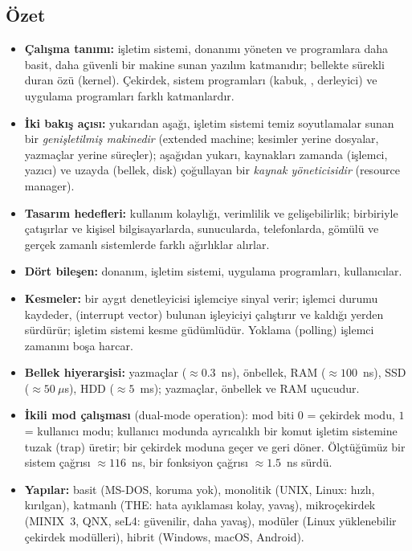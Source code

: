 \subsection*{Özet}
\begin{itemize}
  \item \textbf{Çalışma tanımı:} işletim sistemi, donanımı yöneten ve programlara daha basit, daha güvenli bir makine sunan yazılım katmanıdır; bellekte sürekli duran özü  (kernel). Çekirdek, sistem programları (kabuk, , derleyici) ve uygulama programları farklı katmanlardır.
  \item \textbf{İki bakış açısı:} yukarıdan aşağı, işletim sistemi temiz soyutlamalar sunan bir \emph{genişletilmiş makinedir} (extended machine; kesimler yerine dosyalar, yazmaçlar yerine süreçler); aşağıdan yukarı, kaynakları zamanda (işlemci, yazıcı) ve uzayda (bellek, disk) çoğullayan bir \emph{kaynak yöneticisidir} (resource manager).
  \item \textbf{Tasarım hedefleri:} kullanım kolaylığı, verimlilik ve gelişebilirlik; birbiriyle çatışırlar ve kişisel bilgisayarlarda, sunucularda, telefonlarda, gömülü ve gerçek zamanlı sistemlerde farklı ağırlıklar alırlar.
  \item \textbf{Dört bileşen:} donanım, işletim sistemi, uygulama programları, kullanıcılar.
  \item \textbf{Kesmeler:} bir aygıt denetleyicisi işlemciye sinyal verir; işlemci durumu kaydeder,  (interrupt vector) bulunan işleyiciyi çalıştırır ve kaldığı yerden sürdürür; işletim sistemi kesme güdümlüdür. Yoklama (polling) işlemci zamanını boşa harcar.
  \item \textbf{Bellek hiyerarşisi:} yazmaçlar ($\approx 0.3$~ns), önbellek, RAM ($\approx 100$~ns), SSD ($\approx 50\ \mu$s), HDD ($\approx 5$~ms); yazmaçlar, önbellek ve RAM uçucudur.
  \item \textbf{İkili mod çalışması} (dual-mode operation): mod biti $0$ = çekirdek modu, $1$ = kullanıcı modu; kullanıcı modunda ayrıcalıklı bir komut işletim sistemine tuzak (trap) üretir; bir  çekirdek moduna geçer ve geri döner. Ölçtüğümüz bir sistem çağrısı $\approx 116$~ns, bir fonksiyon çağrısı $\approx 1.5$~ns sürdü.
  \item \textbf{Yapılar:} basit (MS-DOS, koruma yok), monolitik (UNIX, Linux: hızlı, kırılgan), katmanlı (THE: hata ayıklaması kolay, yavaş), mikroçekirdek (MINIX~3, QNX, seL4: güvenilir, daha yavaş), modüler (Linux yüklenebilir çekirdek modülleri), hibrit (Windows, macOS, Android).
\end{itemize}

